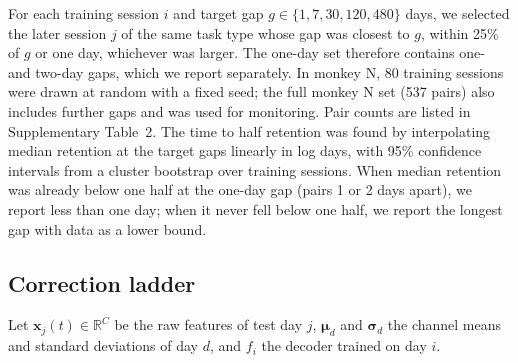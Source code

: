 \documentclass[pdflatex,sn-nature]{sn-jnl}
\begin{document}
For each training session $i$ and target gap $g \in \{1, 7, 30, 120, 480\}$ days, we selected the later session $j$ of
the same task type whose gap was closest to $g$, within 25\% of $g$ or one day, whichever was larger. The one-day set
therefore contains one- and two-day gaps, which we report separately. In monkey N, 80 training sessions were drawn at
random with a fixed seed; the full monkey N set (537 pairs) also includes further gaps and was used for monitoring. Pair
counts are listed in Supplementary Table~2. The time to half retention was found by interpolating median retention at
the target gaps linearly in log days, with 95\% confidence intervals from a cluster bootstrap over training sessions.
When median retention was already below one half at the one-day gap (pairs 1 or 2 days apart), we report less than one
day; when it never fell below one half, we report the longest gap with data as a lower bound.

\subsection*{Correction ladder}

Let $\mathbf{x}_j(t) \in \mathbb{R}^C$ be the raw features of test day $j$, $\boldsymbol{\mu}_d$ and
$\boldsymbol{\sigma}_d$ the channel means and standard deviations of day $d$, and $f_i$ the decoder trained on day $i$.
\end{document}
